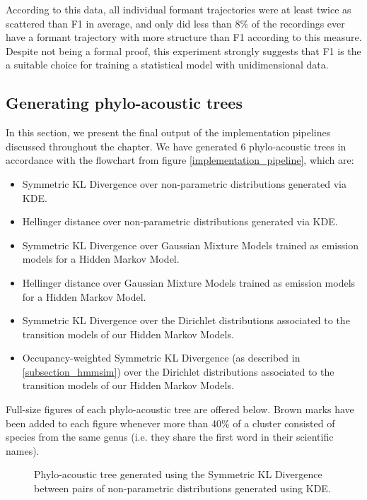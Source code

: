 \documentclass[../main.tex]{subfiles}
\begin{document}
\par According to this data, all individual formant trajectories were at least twice as scattered than F1 in average, and only did less than 8\% of the recordings ever have a formant trajectory with more structure than F1 according to this measure. Despite not being a formal proof, this experiment strongly suggests that F1 is the a suitable choice for training a statistical model with unidimensional data.

\subsection{Generating phylo-acoustic trees} \label{subsection_phylo}
In this section, we present the final output of the implementation pipelines discussed throughout the chapter. We have generated 6 phylo-acoustic trees in accordance with the flowchart from figure \ref{implementation_pipeline}, which are:
\begin{itemize}
\item Symmetric KL Divergence over non-parametric distributions generated via KDE.
\item Hellinger distance over non-parametric distributions generated via KDE.
\item Symmetric KL Divergence over Gaussian Mixture Models trained as emission models for a Hidden Markov Model.
\item Hellinger distance over Gaussian Mixture Models trained as emission models for a Hidden Markov Model.
\item Symmetric KL Divergence over the Dirichlet distributions associated to the transition models of our Hidden Markov Models.
\item Occupancy-weighted Symmetric KL Divergence (as described in \ref{subsection_hmmsim}) over the Dirichlet distributions associated to the transition models of our Hidden Markov Models.
\end{itemize}
\par Full-size figures of each phylo-acoustic tree are offered below. Brown marks have been added to each figure whenever more than 40\% of a cluster consisted of species from the same genus (i.e. they share the first word in their scientific names). 
\begin{sidewaysfigure}[!ht]
\noindent{}
    \caption{Phylo-acoustic tree generated using the Symmetric KL Divergence between pairs of non-parametric distributions generated using KDE.}
    \label{fig:kdeskld}
\end{sidewaysfigure}
\end{document}
